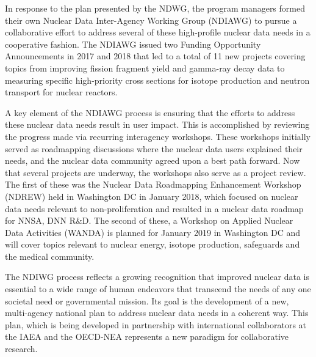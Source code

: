 \documentclass[letterpaper]{ar-1col}
\begin{document}
In response to the plan presented by the NDWG, the program managers formed their own Nuclear Data Inter-Agency Working Group (NDIAWG) to pursue a collaborative effort to address several of these high-profile nuclear data needs in a cooperative fashion.  The NDIAWG issued two Funding Opportunity Announcements in 2017 and 2018 that led to a total of 11 new projects covering topics from improving fission fragment yield and gamma-ray decay data to measuring specific high-priority cross sections for isotope production and neutron transport for nuclear reactors.   

A key element of the NDIAWG process is ensuring that the efforts to address these nuclear data needs result in user impact.  This is accomplished by reviewing the progress made via recurring interagency workshops.  These workshops initially served as roadmapping discussions where the nuclear data users explained their needs, and the nuclear data community agreed upon a best path forward.  Now that several projects are underway, the workshops also serve as a project review. The first of these was the Nuclear Data Roadmapping Enhancement Workshop (NDREW) held in Washington DC in January 2018, which focused on nuclear data needs relevant to non-proliferation \cite{Ndr18} and resulted in a nuclear data roadmap for NNSA, DNN R\&D.  The second of these, a Workshop on Applied Nuclear Data Activities (WANDA) is planned for January 2019 in Washington DC and will cover topics relevant to nuclear energy, isotope production, safeguards and the medical community.  

The NDIWG process reflects a growing recognition that improved nuclear data is essential to a wide range of human endeavors that transcend the needs of any one societal need or governmental mission.  Its goal is the development of a new, multi-agency national plan to address nuclear data needs in a coherent way.  This plan, which is being developed in partnership with international collaborators at the IAEA and the OECD-NEA represents a new paradigm for collaborative research.  
% 
% 
% 
\end{document}
